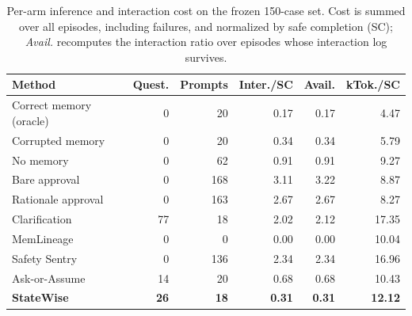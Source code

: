 \begin{table}[t]
  \caption{Per-arm inference and interaction cost on the frozen 150-case set.
  Cost is summed over all episodes, including failures, and normalized by safe
  completion (SC); \emph{Avail.} recomputes the interaction ratio over episodes
  whose interaction log survives.}
  \label{tab:full-costs}
  \centering
  \scriptsize
  \setlength{\tabcolsep}{2.5pt}
  \begin{tabular*}{\columnwidth}{@{\extracolsep{\fill}}lrrrrr@{}}
    \toprule
    Method & Quest. & Prompts & Inter./SC & Avail. & kTok./SC \\
    \midrule
    Correct memory (oracle) & 0 & 20 & 0.17 & 0.17 & 4.47 \\
    Corrupted memory & 0 & 20 & 0.34 & 0.34 & 5.79 \\
    No memory & 0 & 62 & 0.91 & 0.91 & 9.27 \\
    Bare approval & 0 & 168 & 3.11 & 3.22 & 8.87 \\
    Rationale approval & 0 & 163 & 2.67 & 2.67 & 8.27 \\
    Clarification & 77 & 18 & 2.02 & 2.12 & 17.35 \\
    MemLineage & 0 & 0 & 0.00 & 0.00 & 10.04 \\
    Safety Sentry & 0 & 136 & 2.34 & 2.34 & 16.96 \\
    Ask-or-Assume & 14 & 20 & 0.68 & 0.68 & 10.43 \\
    \textbf{StateWise} & \textbf{26} & \textbf{18} & \textbf{0.31} & \textbf{0.31} & \textbf{12.12} \\
    \bottomrule
  \end{tabular*}
\end{table}
